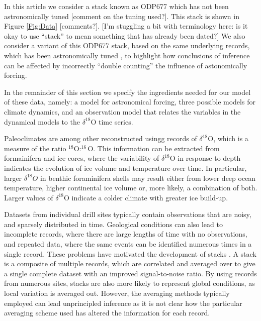 \documentclass[a4paper,12pt]{article}
\newcommand{\spp}[1]{\par\medskip\noindent\fbox{\parbox{\textwidth}{\textbf{Comment by SPP}: #1 }}\medskip}
\begin{document}
In this article we consider a stack known as ODP677 which has not been
astronomically tuned \cite{Huybers2007} [comment on the tuning used?].  
This stack is shown in Figure
\ref{Fig:Data} [comments?].  [I'm stuggling a bit with terminology here: is it okay to
use ``stack'' to mean something that has already been dated?]  We also consider a
variant of this ODP677 stack, based on the same underlying records, which has been 
astronomically
tuned \cite{Lisiecki2005}, to highlight how conclusions of inference can be affected by
incorrectly ``double counting'' the influence of astonomically forcing.

In the remainder of this section we specify the ingredients needed for our model of these 
data, namely: a model for astronomical forcing, three possible models for climate
dynamics, and an observation model that relates the variables in the dynamical models to the 
$\delta^{18}\mbox{O}$ time series. 


\spp{Anything alse needed from below?}

\color{gray}

Paleoclimates are among other reconstructed usingg records of $\delta^{18}$O, which is a measure of the ratio
$^{18}\mbox{O}:^{16}\mbox{O}$.  This information can be extracted from formainifera and ice-cores, where the
variability of $\delta^{18}$O in response to depth indicates the evolution of ice volume and temperature over time.  In
particular, larger $\delta^{18}O$ in benthic foraminifera shells may result either from lower deep ocean temperature,
higher continental ice volume or, more likely, a combination of both.  Larger values of $\delta^{18}$O indicate a
colder climate with greater ice build-up.


Datasets from individual drill sites typically contain observations that are noisy, and sparsely distributed in time.
Geological conditions can also lead to incomplete records, where there are large lengths of time with no observations, and repeated data, where the same events can be identified numerous times in a single record.
These problems have motivated the development of stacks \cite{Lisiecki2005,Huybers2007}.
A stack is a composite of multiple records, which are correlated and averaged over to give a single complete dataset with an improved signal-to-noise ratio.
By using records from numerous sites, stacks are also more likely to represent global conditions, as local variation is averaged out.
However, the averaging methods typically employed can lead unprincipled inference as it is not clear how the particular averaging scheme used has altered the information for each record.
\end{document}
